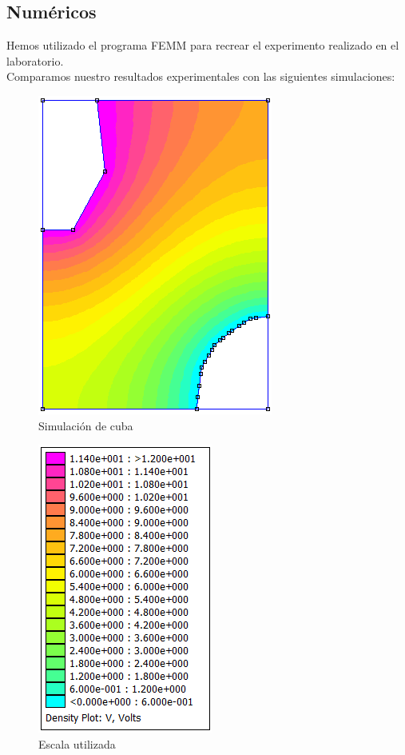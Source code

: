 \documentclass{article}
\begin{document}
        \subsection{Numéricos}
        Hemos utilizado el programa FEMM para recrear el experimento realizado en el laboratorio.\\
        
Comparamos nuestro resultados experimentales con las siguientes simulaciones:

\begin{figure}[H]
\centering
\includegraphics[scale=1]{cuba.png}
\caption{Simulación de cuba}
\label{fig:1}
\end{figure}  
        
\begin{figure}[H]
\centering
\includegraphics[scale=1]{escala.png}
\caption{Escala utilizada}
\label{fig:2}
\end{figure} 
\end{document}
